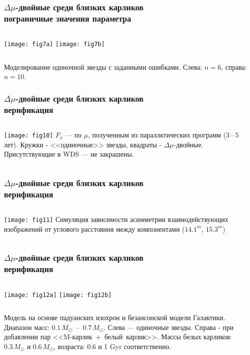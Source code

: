 \begin{frame}%
\frametitle{$\Delta\mu$-двойные среди близких карликов\\{\small пограничные значения параметра}}
\begin{center}
\begin{columns}
	\texttt{[image: fig7a]}
	\texttt{[image: fig7b]}
\end{columns}
\end{center}
{\footnotesize Моделирование одиночной звезды с заданными ошибками. Слева: $n=6$, справа: $n=10$.}
\end{frame}


\begin{frame}
\frametitle{$\Delta\mu$-двойные среди близких карликов\\{\small верификация}}
\begin{columns}
	\texttt{[image: fig10]}
	{\footnotesize
		$F_{\pi}$ --- по $\mu$, полученным из параллктических программ (3\,--\,5 лет). Кружки - <<одиночные>> звезды, квадраты - $\Delta\mu$-двойные. Присутствующие в WDS --- не закрашены. 
	}
\end{columns}
\end{frame}


\begin{frame}
\frametitle{$\Delta\mu$-двойные среди близких карликов\\{\small верификация}}
\begin{columns}
	\texttt{[image: fig11]}
	{\footnotesize
		Симуляция зависимости асимметрии взаимодействующих изображений от углового расстояния между компонентами ($14.1^m$, $15.3^m$) 
	}
\end{columns}
\end{frame}


\begin{frame}
\frametitle{$\Delta\mu$-двойные среди близких карликов\\{\small верификация}}
\begin{center}
\begin{columns}
	\texttt{[image: fig12a]}
	\texttt{[image: fig12b]}
\end{columns}
\end{center}
{\footnotesize 
	Модель на основе падуанских изохрон и безансонской модели Галактики. Диапазон масс: $0.1\,M_{\odot}$~--~$0.7\,M_{\odot}$. Слева --- одиночные звезды. Справа - при добавлении пар <<M-карлик~+~белый~карлик>>. Массы белых карликов: $0.3\,M_{\odot}$ и $0.6\,M_{\odot}$, возраста: 0.6 и 1 Gyr соответственно.
}
\end{frame}


